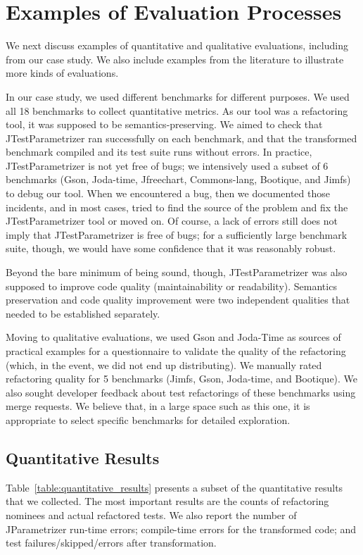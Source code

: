 \section{Examples of Evaluation Processes}
\label{sec:our-evaluation-process}

We next discuss examples of quantitative and qualitative
evaluations, including from our case study. We also include
examples from the literature to illustrate more kinds
of evaluations.

In our case study, we used different benchmarks for
different purposes. We used all 18 benchmarks to collect quantitative
metrics. As our tool was a refactoring tool, it was supposed to be
semantics-preserving. We aimed to check that JTestParametrizer ran
successfully on each benchmark, and that the transformed benchmark
compiled and its test suite runs without errors.  In practice,
JTestParametrizer is not yet free of bugs; we intensively used a
subset of 6 benchmarks (Gson, Joda-time, Jfreechart, Commons-lang,
Bootique, and Jimfs) to debug our tool.  When we encountered a bug,
then we documented those incidents, and in most cases, tried to find
the source of the problem and fix the JTestParametrizer tool or moved
on. Of course, a lack of errors still does not imply that
JTestParametrizer is free of bugs; for a sufficiently large benchmark suite,
though, we would have some confidence that it was reasonably robust.

Beyond the bare minimum of being sound, though, JTestParametrizer was
also supposed to improve code quality (maintainability or
readability). Semantics preservation and code quality improvement were
two independent qualities that needed to be established separately.

Moving to qualitative evaluations, we used Gson and Joda-Time as
sources of practical examples for a questionnaire to validate the
quality of the refactoring (which, in the event, we did not end up
distributing).  We manually rated refactoring quality for 5 benchmarks
(Jimfs, Gson, Joda-time, and Bootique). We also sought developer
feedback about test refactorings of these benchmarks using merge
requests.  We believe that, in a large space such as this one, it is
appropriate to select specific benchmarks for detailed exploration.

\subsection{Quantitative Results}
Table~\ref{table:quantitative_results} presents a subset of the
quantitative results that we collected. The most important results are
the counts of refactoring nominees and actual refactored tests. We
also report the number of JParametrizer run-time errors; compile-time
errors for the transformed code; and test failures/skipped/errors
after transformation.

